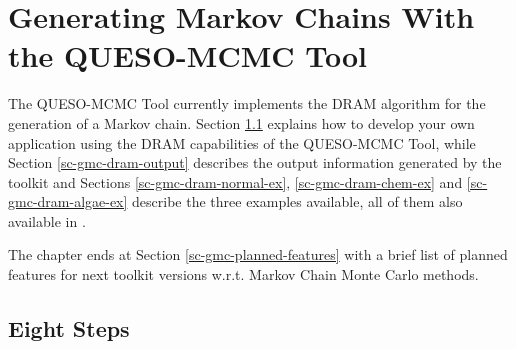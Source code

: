 \chapter{Generating Markov Chains With the QUESO-MCMC Tool}\label{ch-gmc}
\thispagestyle{headings}

The QUESO-MCMC Tool currently implements the DRAM algorithm \cite{HaLaMiSa06} for the generation of a Markov chain.
Section \ref{sc-gmc-eight-steps} explains how to develop your own application using the DRAM capabilities of the QUESO-MCMC Tool, while
Section \ref{sc-gmc-dram-output} describes the output information generated by the toolkit and
Sections
\ref{sc-gmc-dram-normal-ex},
\ref{sc-gmc-dram-chem-ex} and
\ref{sc-gmc-dram-algae-ex}
describe the three examples available,
all of them also available in \cite{mcmctool}.

The chapter ends at Section \ref{sc-gmc-planned-features} with a brief list of planned features for next toolkit versions w.r.t. Markov Chain Monte Carlo methods.

\section{Eight Steps}\label{sc-gmc-eight-steps}

